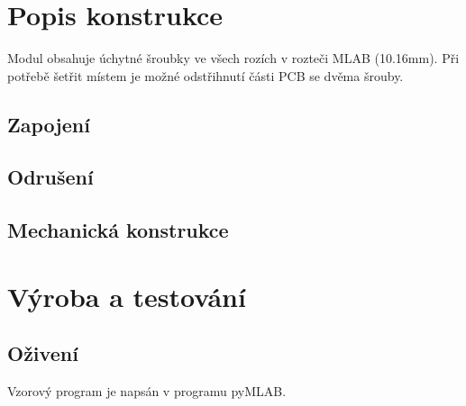 \documentclass[12pt,a4paper,final,titlepage,twoside]{article}
\begin{document}



\section{Popis konstrukce}
Modul obsahuje úchytné šroubky ve všech rozích v rozteči MLAB (10.16mm). Při potřebě šetřit místem je možné odstřihnutí části PCB se dvěma šrouby.
\subsection{Zapojení}


\subsection{Odrušení}

\subsection{Mechanická konstrukce}

\section{Výroba a testování}


\subsection{Oživení}
Vzorový program je napsán v programu pyMLAB.
\end{document}
